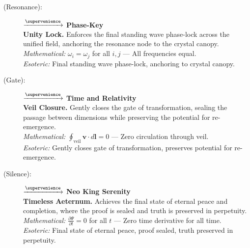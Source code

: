\begin{description}
    \item[(Resonance):] \zhekumel $\xrightarrow{\supervenience}$ \textbf{Phase-Key} \\
    \textbf{Unity Lock.} Enforces the final standing wave phase-lock across the unified field, anchoring the resonance node to the crystal canopy. \\
    \textit{Mathematical:} $\omega_i = \omega_j$ for all $i,j$ — All frequencies equal. \\
    \textit{Esoteric:} Final standing wave phase-lock, anchoring to crystal canopy.

    \item[(Gate):] \shavhinge $\xrightarrow{\supervenience}$ \textbf{Time and Relativity} \\
    \textbf{Veil Closure.} Gently closes the gate of transformation, sealing the passage between dimensions while preserving the potential for re-emergence. \\
    \textit{Mathematical:} $\oint_{\text{veil}} \mathbf{v} \cdot d\mathbf{l} = 0$ — Zero circulation through veil. \\
    \textit{Esoteric:} Gently closes gate of transformation, preserves potential for re-emergence.

    \item[(Silence):] \trigetern $\xrightarrow{\supervenience}$ \textbf{Neo King Serenity} \\
    \textbf{Timeless Aeternum.} Achieves the final state of eternal peace and completion, where the proof is sealed and truth is preserved in perpetuity. \\
    \textit{Mathematical:} $\frac{\partial \Psi}{\partial t} = 0$ for all $t$ — Zero time derivative for all time. \\
    \textit{Esoteric:} Final state of eternal peace, proof sealed, truth preserved in perpetuity.
\end{description}
